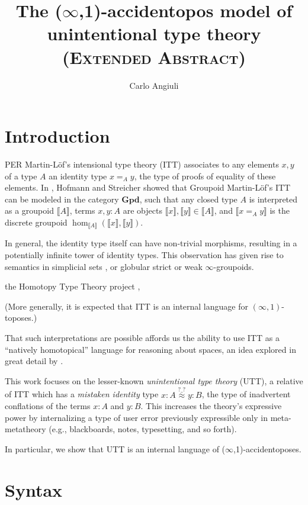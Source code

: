 \documentclass[10pt]{article}
\title{The ($\infty$,1)-accidentopos model of\\ unintentional type theory \\
\textsc{\large{(Extended Abstract)}}}
\author{Carlo Angiuli}
\newcommand\Gpd{\ensuremath{\mathbf{Gpd}}}
\newcommand\Id[3]{\ensuremath{#2 =_{#1} #3}}
\newcommand\interp[1]{\ensuremath{\llbracket #1\rrbracket}}
\newcommand\AccRel{\ensuremath{\overset{?\_?}{\approx}}}
\newcommand\Acc[4]{\ensuremath{#3{:}#1 \AccRel #4{:}#2}}
\begin{document}
\maketitle


\section{Introduction}

PER Martin-L\"of's intensional type theory (ITT) associates to any elements
$x,y$ of a type $A$ an identity type $\Id Axy$, the type of proofs of equality
of these elements. In \cite{HofmannStreicher}, Hofmann and Streicher showed that
Groupoid Martin-L\"of's ITT can be modeled in the category $\Gpd$, such that any
closed type $A$ is interpreted as a groupoid $\interp{A}$, terms $x,y:A$ are
objects $\interp{x},\interp{y}\in\interp{A}$, and $\interp{\Id Axy}$ is the
discrete groupoid $\hom_{\interp A}(\interp x,\interp y)$.

In general, the identity type itself can have non-trivial morphisms, resulting
in a potentially infinite tower of identity types. This observation has given
rise to semantics in simplicial sets \cite{KapulkinLumsdaineVoevodsky}, or
globular strict \cite{Warren} or weak $\infty$-groupoids.

the Homotopy Type Theory project \cite{HoTT}, 


(More generally, it is
expected that ITT is an internal language for $(\infty,1)$-toposes.)

That such interpretations are possible affords us the
ability to use ITT as a ``natively homotopical'' language for reasoning about
spaces, an idea explored in great detail by \cite{HoTTBook}.

This work focuses on the lesser-known \emph{unintentional type theory} (UTT), a
relative of ITT which has a \emph{mistaken identity} type $\Acc ABxy$, the type
of inadvertent conflations of the terms $x:A$ and $y:B$. This increases the
theory's expressive power by internalizing a type of user error previously
expressible only in meta-metatheory (e.g., blackboards, notes, typesetting, and
so forth).

In particular, we show that UTT is an internal language of
($\infty$,1)-accidentoposes.


\section{Syntax}
\end{document}
